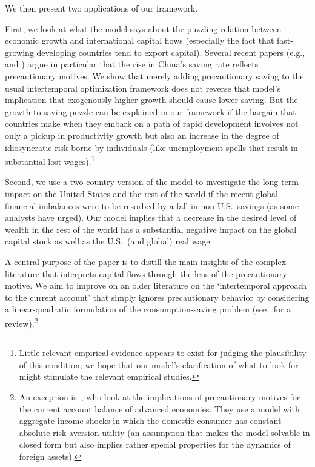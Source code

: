 \documentclass[titlepage]{\econtex}\newcommand{\texname}{cjSOE}
\begin{document}
We then present two applications of our framework. 

First, we look at what the model says about the puzzling relation
between economic growth and international capital flows (especially
the fact that fast-growing developing countries tend to export
capital).  Several recent papers (e.g., \cite{clpChinaSaving} and
\cite{wenChinaSaving}) argue in particular that the rise in China's
saving rate reflects precautionary motives.  We show that merely
adding precautionary saving to the usual intertemporal optimization
framework does not reverse that model's implication that exogenously
higher growth should cause lower saving.  But the growth-to-saving
puzzle can be explained in our framework if the bargain that countries
make when they embark on a path of rapid development involves not only
a pickup in productivity growth but also an increase in the degree of
idiosyncratic risk borne by individuals (like unemployment spells that
result in substantial lost wages).\footnote{Little relevant empirical
evidence appears to exist for judging the plausibility of this condition;
we hope that our model's clarification of what to look for might stimulate 
the relevant empirical studies.}

Second, we use a two-country version of the model to investigate the
long-term impact on the United States and the rest of the world if the
recent global financial imbalances were to be resorbed by a fall in
non-U.S.\ savings (as some analysts have urged). Our model implies
that a decrease in the desired level of wealth in the rest of the
world has a substantial negative impact on the global capital stock as
well as the U.S.\ (and global) real wage.

A central purpose of the paper is to distill the main insights of the
complex literature that interprets capital flows through the lens of
the precautionary motive. We aim to
improve on an older literature on the `intertemporal approach to the
current account' that simply ignores precautionary behavior by
considering a linear-quadratic formulation of the consumption-saving
problem (see~\cite{orIntertemporal} for a review).\footnote{An exception
is~\cite{goJME}, who look at the implications of precautionary motives
for the current account balance of advanced economies. They use a
model with aggregate income shocks in which the domestic consumer has
constant absolute risk aversion utility (an assumption that makes the
model solvable in closed form but also implies rather special
properties for the dynamics of foreign assets).}
\end{document}
